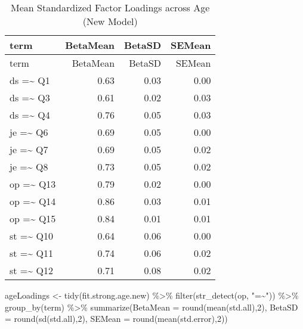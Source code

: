 \documentclass[
  letterpaper,
  DIV=11,
  numbers=noendperiod]{scrartcl}
\newenvironment{Shaded}{\begin{snugshade}}{\end{snugshade}}
\newcommand{\AttributeTok}[1]{\textcolor[rgb]{0.40,0.45,0.13}{#1}}
\newcommand{\DecValTok}[1]{\textcolor[rgb]{0.68,0.00,0.00}{#1}}
\newcommand{\FunctionTok}[1]{\textcolor[rgb]{0.28,0.35,0.67}{#1}}
\newcommand{\NormalTok}[1]{\textcolor[rgb]{0.00,0.23,0.31}{#1}}
\newcommand{\OtherTok}[1]{\textcolor[rgb]{0.00,0.23,0.31}{#1}}
\newcommand{\SpecialCharTok}[1]{\textcolor[rgb]{0.37,0.37,0.37}{#1}}
\newcommand{\StringTok}[1]{\textcolor[rgb]{0.13,0.47,0.30}{#1}}
\begin{document}
\begin{longtable}[]{@{}lrrr@{}}
\caption{Mean Standardized Factor Loadings across Age (New
Model)}\tabularnewline
\toprule\noalign{}
term & BetaMean & BetaSD & SEMean \\
\midrule\noalign{}
\endfirsthead
\toprule\noalign{}
term & BetaMean & BetaSD & SEMean \\
\midrule\noalign{}
\endhead
\bottomrule\noalign{}
\endlastfoot
ds =\textasciitilde{} Q1 & 0.63 & 0.03 & 0.00 \\
ds =\textasciitilde{} Q3 & 0.61 & 0.02 & 0.03 \\
ds =\textasciitilde{} Q4 & 0.76 & 0.05 & 0.03 \\
je =\textasciitilde{} Q6 & 0.69 & 0.05 & 0.00 \\
je =\textasciitilde{} Q7 & 0.69 & 0.05 & 0.02 \\
je =\textasciitilde{} Q8 & 0.73 & 0.05 & 0.02 \\
op =\textasciitilde{} Q13 & 0.79 & 0.02 & 0.00 \\
op =\textasciitilde{} Q14 & 0.86 & 0.03 & 0.01 \\
op =\textasciitilde{} Q15 & 0.84 & 0.01 & 0.01 \\
st =\textasciitilde{} Q10 & 0.64 & 0.06 & 0.00 \\
st =\textasciitilde{} Q11 & 0.74 & 0.06 & 0.02 \\
st =\textasciitilde{} Q12 & 0.71 & 0.08 & 0.02 \\
\end{longtable}

\begin{Shaded}
\begin{Highlighting}[]
\NormalTok{ageLoadings }\OtherTok{\textless{}{-}} \FunctionTok{tidy}\NormalTok{(fit.strong.age.new) }\SpecialCharTok{\%\textgreater{}\%}
  \FunctionTok{filter}\NormalTok{(}\FunctionTok{str\_detect}\NormalTok{(op, }\StringTok{"=\textasciitilde{}"}\NormalTok{)) }\SpecialCharTok{\%\textgreater{}\%}
  \FunctionTok{group\_by}\NormalTok{(term) }\SpecialCharTok{\%\textgreater{}\%}
  \FunctionTok{summarize}\NormalTok{(}\AttributeTok{BetaMean =} \FunctionTok{round}\NormalTok{(}\FunctionTok{mean}\NormalTok{(std.all),}\DecValTok{2}\NormalTok{), }
            \AttributeTok{BetaSD =} \FunctionTok{round}\NormalTok{(}\FunctionTok{sd}\NormalTok{(std.all),}\DecValTok{2}\NormalTok{), }
            \AttributeTok{SEMean =} \FunctionTok{round}\NormalTok{(}\FunctionTok{mean}\NormalTok{(std.error),}\DecValTok{2}\NormalTok{))}
\end{Highlighting}
\end{Shaded}
\end{document}
